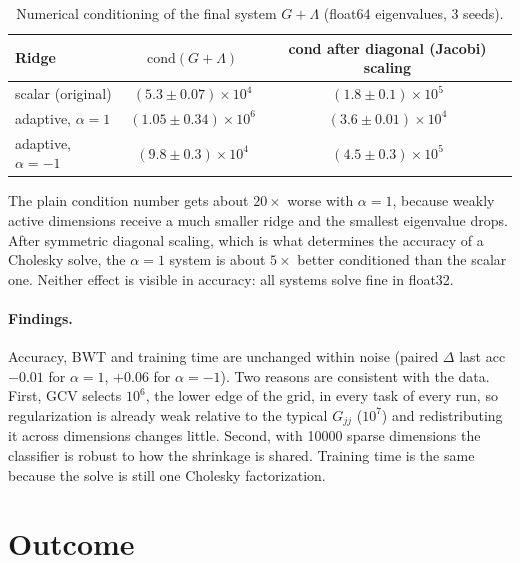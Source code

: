 \documentclass[11pt,a4paper]{article}
\begin{document}
\begin{table}[h]
\centering
\caption{Numerical conditioning of the final system $G + \Lambda$ (float64 eigenvalues, 3 seeds).}
\label{tab:cond}
\small
\begin{tabular}{lcc}
\toprule
Ridge & $\mathrm{cond}(G + \Lambda)$ & cond after diagonal (Jacobi) scaling \\
\midrule
scalar (original)       & $(5.3 \pm 0.07)\times10^4$ & $(1.8 \pm 0.1)\times10^5$ \\
adaptive, $\alpha = 1$  & $(1.05 \pm 0.34)\times10^6$ & $(3.6 \pm 0.01)\times10^4$ \\
adaptive, $\alpha = -1$ & $(9.8 \pm 0.3)\times10^4$ & $(4.5 \pm 0.3)\times10^5$ \\
\bottomrule
\end{tabular}
\end{table}

The plain condition number gets about $20\times$ worse with $\alpha = 1$, because weakly active
dimensions receive a much smaller ridge and the smallest eigenvalue drops. After symmetric
diagonal scaling, which is what determines the accuracy of a Cholesky solve, the $\alpha = 1$
system is about $5\times$ better conditioned than the scalar one. Neither effect is visible in
accuracy: all systems solve fine in float32.

\paragraph{Findings.} Accuracy, BWT and training time are unchanged within noise (paired $\Delta$
last acc $-0.01$ for $\alpha = 1$, $+0.06$ for $\alpha = -1$). Two reasons are consistent with the
data. First, GCV selects $10^6$, the lower edge of the grid, in every task of every run, so
regularization is already weak relative to the typical $G_{jj}$ ($10^7$) and redistributing it
across dimensions changes little. Second, with 10000 sparse dimensions the classifier is robust to
how the shrinkage is shared. Training time is the same because the solve is still one Cholesky
factorization.

\section{Outcome}
\end{document}
